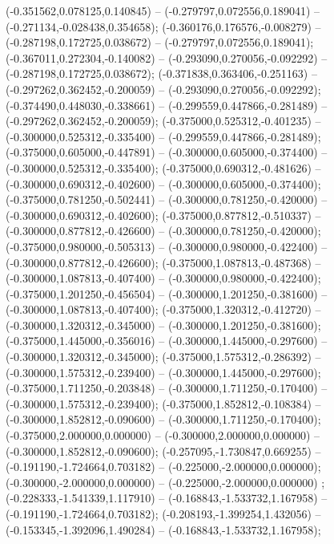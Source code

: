  (-0.351562,0.078125,0.140845) -- (-0.279797,0.072556,0.189041) -- (-0.271134,-0.028438,0.354658);
 (-0.360176,0.176576,-0.008279) -- (-0.287198,0.172725,0.038672) -- (-0.279797,0.072556,0.189041);
 (-0.367011,0.272304,-0.140082) -- (-0.293090,0.270056,-0.092292) -- (-0.287198,0.172725,0.038672);
 (-0.371838,0.363406,-0.251163) -- (-0.297262,0.362452,-0.200059) -- (-0.293090,0.270056,-0.092292);
 (-0.374490,0.448030,-0.338661) -- (-0.299559,0.447866,-0.281489) -- (-0.297262,0.362452,-0.200059);
 (-0.375000,0.525312,-0.401235) -- (-0.300000,0.525312,-0.335400) -- (-0.299559,0.447866,-0.281489);
 (-0.375000,0.605000,-0.447891) -- (-0.300000,0.605000,-0.374400) -- (-0.300000,0.525312,-0.335400);
 (-0.375000,0.690312,-0.481626) -- (-0.300000,0.690312,-0.402600) -- (-0.300000,0.605000,-0.374400);
 (-0.375000,0.781250,-0.502441) -- (-0.300000,0.781250,-0.420000) -- (-0.300000,0.690312,-0.402600);
 (-0.375000,0.877812,-0.510337) -- (-0.300000,0.877812,-0.426600) -- (-0.300000,0.781250,-0.420000);
 (-0.375000,0.980000,-0.505313) -- (-0.300000,0.980000,-0.422400) -- (-0.300000,0.877812,-0.426600);
 (-0.375000,1.087813,-0.487368) -- (-0.300000,1.087813,-0.407400) -- (-0.300000,0.980000,-0.422400);
 (-0.375000,1.201250,-0.456504) -- (-0.300000,1.201250,-0.381600) -- (-0.300000,1.087813,-0.407400);
 (-0.375000,1.320312,-0.412720) -- (-0.300000,1.320312,-0.345000) -- (-0.300000,1.201250,-0.381600);
 (-0.375000,1.445000,-0.356016) -- (-0.300000,1.445000,-0.297600) -- (-0.300000,1.320312,-0.345000);
 (-0.375000,1.575312,-0.286392) -- (-0.300000,1.575312,-0.239400) -- (-0.300000,1.445000,-0.297600);
 (-0.375000,1.711250,-0.203848) -- (-0.300000,1.711250,-0.170400) -- (-0.300000,1.575312,-0.239400);
 (-0.375000,1.852812,-0.108384) -- (-0.300000,1.852812,-0.090600) -- (-0.300000,1.711250,-0.170400);
 (-0.375000,2.000000,0.000000) -- (-0.300000,2.000000,0.000000) -- (-0.300000,1.852812,-0.090600);
 (-0.257095,-1.730847,0.669255) -- (-0.191190,-1.724664,0.703182) -- (-0.225000,-2.000000,0.000000);
 (-0.300000,-2.000000,0.000000) -- (-0.225000,-2.000000,0.000000) ;
 (-0.228333,-1.541339,1.117910) -- (-0.168843,-1.533732,1.167958) -- (-0.191190,-1.724664,0.703182);
 (-0.208193,-1.399254,1.432056) -- (-0.153345,-1.392096,1.490284) -- (-0.168843,-1.533732,1.167958);
